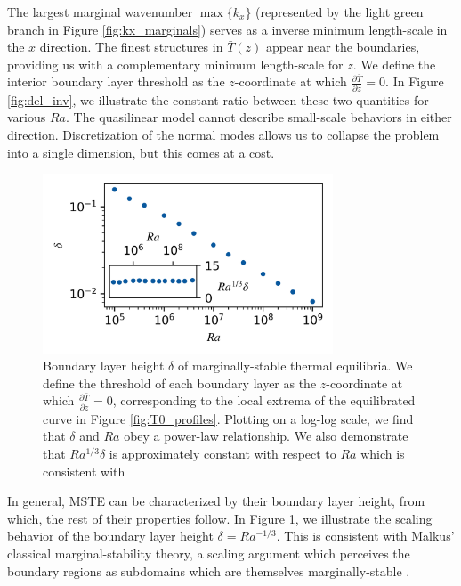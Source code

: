 \documentclass[reprint,amsmath,amssymb,aps]{revtex4-1}
\begin{document}
The largest marginal wavenumber $\max \{ k_x \}$ (represented by the light green branch in Figure \ref{fig:kx_marginals}) serves as a inverse minimum length-scale in the $x$ direction. The finest structures in $\bar{T}(z)$ appear near the boundaries, providing us with a complementary minimum length-scale for $z$. We define the interior boundary layer threshold as the $z$-coordinate at which $\frac{\partial \bar{T}}{\partial z} = 0$. In Figure \ref{fig:del_inv}, we illustrate the constant ratio between these two quantities for various $Ra$. The quasilinear model cannot describe small-scale behaviors in either direction. Discretization of the normal modes allows us to collapse the problem into a single dimension, but this comes at a cost.  

\begin{figure}
    \centering
    \includegraphics[width=3.4in]{del_ra.PNG}
    \caption{Boundary layer height $\delta$ of marginally-stable thermal equilibria. 
    We define the threshold of each boundary layer as the $z$-coordinate at which $\frac{\partial \bar{T}}{\partial z} = 0$, corresponding to the local extrema of the equilibrated curve in Figure \ref{fig:T0_profiles}. 
    Plotting on a log-log scale, we find that $\delta$ and $Ra$ obey a power-law relationship. We also demonstrate that $Ra^{1/3}\delta$ is approximately constant with respect to $Ra$ which is consistent with \cite{Malkus_1954, Wen}}
    \label{fig:bl_ra}
\end{figure}

In general, MSTE can be characterized by their boundary layer height, from which, the rest of their properties follow. In Figure \ref{fig:bl_ra}, we illustrate the scaling behavior of the boundary layer height $\delta = Ra^{-1/3}$. 
This is consistent with Malkus' classical marginal-stability theory, a scaling argument which perceives the boundary regions as subdomains which are themselves marginally-stable \cite{Malkus_1954}.
\end{document}
